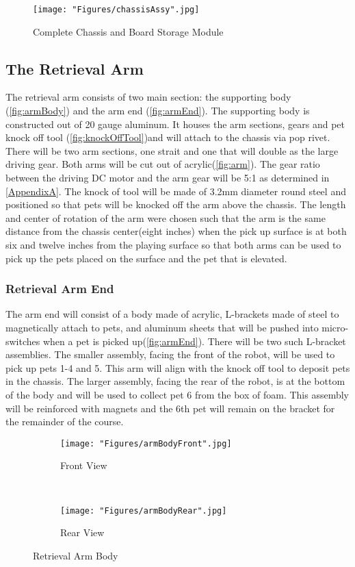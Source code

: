 \documentclass[11pt, oneside]{article} %
\begin{document}
		\begin{figure}[!ht]
			\centering
			\texttt{[image: "Figures/chassisAssy".jpg]}
			\caption[Complete Chassis and Board Storage Module]{Complete Chassis and Board Storage Module}
			\label{fig:chassisAssy}
		\end{figure}
		
	\subsection{The Retrieval Arm}
	The retrieval arm consists of two main section: the supporting body (\autoref{fig:armBody}) and the arm end (\autoref{fig:armEnd}). The supporting body is constructed out of 20 gauge aluminum. It houses the arm sections, gears and pet knock off tool (\autoref{fig:knockOffTool})and will attach to the chassis via pop rivet. There will be two arm sections, one strait and one that will double as the large driving gear. Both arms will be cut out of acrylic(\autoref{fig:arm}). The gear ratio between the driving DC motor and the arm gear will be 5:1 as determined in \autoref{AppendixA}. The knock of tool will be made of 3.2mm diameter round steel and positioned so that pets will be knocked off the arm above the chassis. The length and center of rotation of the arm were chosen such that the arm is the same distance from the chassis center(eight inches) when the pick up surface is at both six and twelve inches from the playing surface so that both arms can be used to pick up the pets placed on the surface and the pet that is elevated.
	
		\subsubsection{Retrieval Arm End}
		The arm end will consist of a body made of acrylic, L-brackets made of steel to magnetically attach to pets, and aluminum sheets that will be pushed into micro-switches when a pet is picked up(\autoref{fig:armEnd}). There will be two such L-bracket assemblies. The smaller assembly, facing the front of the robot, will be used to pick up pets 1-4 and 5. This arm will align with the knock off tool to deposit pets in the chassis. The larger assembly, facing the rear of the robot, is at the bottom of the body and will be used to collect pet 6 from the box of foam. This assembly will be reinforced with magnets and the 6th pet will remain on the bracket for the remainder of the course.
		
	\begin{figure}[h]
		\centering
		\begin{subfigure}[b]{0.4\textwidth}
			\centering
			\texttt{[image: "Figures/armBodyFront".jpg]}
			\caption{Front View}
		\end{subfigure}
		~
		\begin{subfigure}[b]{0.5\textwidth}
			\centering
			\texttt{[image: "Figures/armBodyRear".jpg]}
			\caption{Rear View}
		\end{subfigure}
		\caption[Retrieval Arm Body]{Retrieval Arm Body}
		\label{fig:armBody}
	\end{figure}
		
\end{document}
